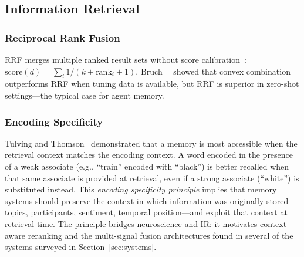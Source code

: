 \subsection{Information Retrieval}

\subsubsection{Reciprocal Rank Fusion}
RRF merges multiple ranked result sets without score
calibration~\cite{cormack2009rrf}: $\text{score}(d) = \sum_i 1 / (k +
\text{rank}_i + 1)$. Bruch~\etal~\cite{bruch2023} showed that convex
combination outperforms RRF when tuning data is available, but RRF is
superior in zero-shot settings---the typical case for agent memory.

\subsubsection{Encoding Specificity}
Tulving and Thomson~\cite{tulving1973} demonstrated that a memory is
most accessible when the retrieval context matches the encoding
context. A word encoded in the presence of a weak associate (e.g.,
``train'' encoded with ``black'') is better recalled when that same
associate is provided at retrieval, even if a strong associate
(``white'') is substituted instead. This \emph{encoding specificity
principle} implies that memory systems should preserve the context in
which information was originally stored---topics, participants,
sentiment, temporal position---and exploit that context at retrieval
time. The principle bridges neuroscience and IR: it motivates context-aware
reranking and the multi-signal fusion architectures found in several of
the systems surveyed in Section~\ref{sec:systems}.
